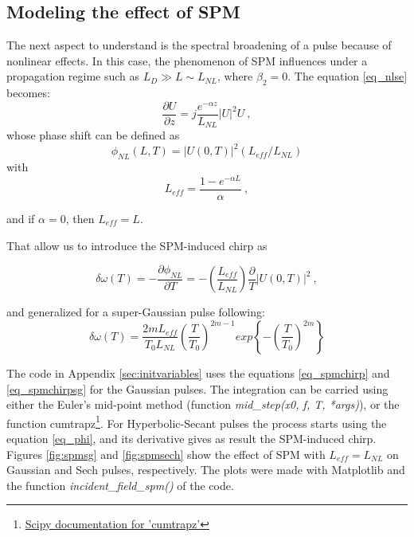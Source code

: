         \subsection{Modeling the effect of SPM}
        The next aspect to understand is the spectral broadening of a pulse because of nonlinear effects. In this case, the phenomenon of SPM influences under a propagation regime such as $ L_D \gg L \sim L_{NL} $, where $\beta_2=0$. The equation \eqref{eq_nlse} becomes: 
            \begin{equation}
                \frac{\partial U}{\partial z} = j\frac{e^{-\alpha z}}{L_{NL}}|U|^2 U \ ,
            \end{equation}
            whose phase shift can be defined as 
            \begin{equation} \label{eq_phi}
                \phi_{NL}(L,T) = |U(0,T)|^2 (L_{eff}/L_{NL})
            \end{equation}
            with 
            \begin{equation} \label{eq_leff}
                L_{eff} = \frac{1-e^{-\alpha L}}{\alpha} \ ,
            \end{equation}
            
              and if  $\alpha = 0$, then $L_{eff} = L$.
            
            That allow us to introduce the SPM-induced chirp as
            
            \begin{equation} \label{eq_spmchirp}
                \delta \omega(T) = -\frac{\partial \phi_{NL}}{\partial T} = -\left( \frac{L_{eff}}{L_{NL}} \right) \frac{\partial }{T} |U(0,T)|^2 \ ,
            \end{equation}
        
        
         and generalized for a super-Gaussian pulse following:
            \begin{equation} \label{eq_spmchirpsg}
                \delta \omega(T) = \frac{2m L_{eff}}{T_0 L_{NL}}\left( \frac{T}{T_0}\right)^{2m-1}  exp\left\{ -\left( \frac{T}{T_0}\right)^{2m}   \right\}
            \end{equation}
        
        The code in Appendix \ref{sec:initvariables} uses the equations \eqref{eq_spmchirp} and \eqref{eq_spmchirpsg} for the Gaussian pulses. The integration can be carried using either the Euler's mid-point method \citep{euler} (function \emph{mid\_step(x0, f, T, *args)}), or the function cumtrapz\footnote{\href{https://docs.scipy.org/doc/scipy-0.14.0/reference/generated/scipy.integrate.cumtrapz.html}{Scipy documentation for 'cumtrapz'}}. For Hyperbolic-Secant pulses the process starts using the equation \eqref{eq_phi}, and its derivative gives as result the SPM-induced chirp. Figures \ref{fig:spmsg} and \ref{fig:spmsech} show the effect of SPM with $L_{eff} = L_{NL}$ \citep{AgrawalBook} on Gaussian and Sech pulses, respectively. The plots were made with Matplotlib and the function \emph{incident\_field\_spm()} of the code.
        
